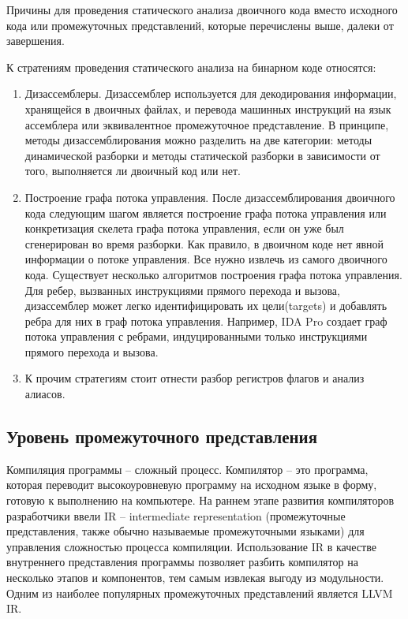 Причины для проведения статического анализа двоичного кода вместо исходного кода или промежуточных представлений, которые 
перечислены выше, далеки от завершения.

К стратениям проведения статического анализа на бинарном коде относятся\cite{Zeng2012StaticAO}:
\begin{enumerate}
    \item Дизассемблеры. Дизассемблер используется для декодирования информации, хранящейся в двоичных файлах, и перевода 
        машинных инструкций на язык ассемблера или эквивалентное промежуточное представление. В принципе, методы 
        дизассемблирования можно разделить на две категории: методы динамической разборки и методы статической разборки в 
        зависимости от того, выполняется ли двоичный код или нет. 
    \item Построение графа потока управления. После дизассемблирования двоичного кода следующим шагом является построение 
        графа потока управления или конкретизация скелета графа потока управления, если он уже был сгенерирован во время
        разборки. Как правило, в двоичном коде нет явной информации о потоке управления. Все нужно извлечь из самого 
        двоичного кода. Существует несколько алгоритмов построения графа потока управления. Для ребер, вызванных 
        инструкциями прямого перехода и вызова, дизассемблер может легко идентифицировать их цели(targets) и добавлять 
        ребра для них в граф потока управления. Например, IDA Pro\cite{10.5555/1481438} создает граф потока управления с ребрами, 
        индуцированными только инструкциями прямого перехода и вызова. 
    \item К прочим стратегиям стоит отнести разбор регистров флагов и анализ алиасов.
\end{enumerate}

\subsection{Уровень промежуточного представления}
Компиляция программы -- сложный процесс. Компилятор -- это программа, которая переводит высокоуровневую программу на исходном языке в форму, готовую к 
выполнению на компьютере. На раннем этапе развития компиляторов разработчики ввели IR -- intermediate representation (промежуточные представления, 
также обычно называемые промежуточными языками) для управления сложностью процесса компиляции. Использование IR в качестве внутреннего представления 
программы позволяет разбить компилятор на несколько этапов и компонентов, тем самым извлекая выгоду из модульности. Одним из наиболее популярных 
промежуточных представлений является LLVM IR.

